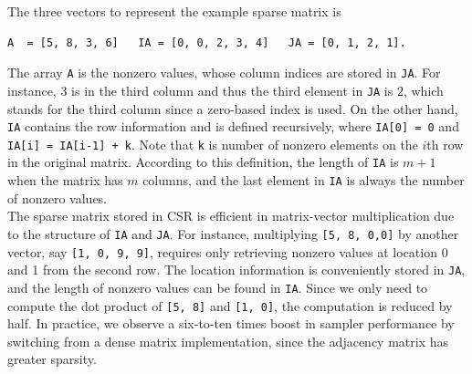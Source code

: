 \documentclass{svjour3}
\begin{document}
\noindent The three vectors to represent the example sparse matrix is
\begin{verbatim}
A  = [5, 8, 3, 6]   IA = [0, 0, 2, 3, 4]   JA = [0, 1, 2, 1].
\end{verbatim}

The array \texttt{A} is the nonzero values, whose column indices are stored in  \texttt{JA}.
For instance, 3 is in the third column and thus the third element in \texttt{JA}  is 2, which stands for the third column since a zero-based index is used.
On the other hand, \texttt{IA}  contains the row information and is defined recursively, where  \texttt{IA[0] = 0}  and  \texttt{IA[i] = IA[i-1] + k}.
Note that \texttt{k} is  number of nonzero elements on the $i$th row in the original matrix.
According to this definition, the length of \texttt{IA} is $m + 1$ when the matrix has $ m $ columns, and the last element in \texttt{IA} is always the number of nonzero values.\\

The sparse matrix stored in CSR is efficient in matrix-vector multiplication due to the structure of \texttt{IA} and \texttt{JA}.
For instance, multiplying \texttt{[5, 8, 0,0]} by another vector, say \texttt{[1, 0, 9, 9]}, requires only retrieving nonzero values at location 0 and 1 from the second row.
The location information is conveniently stored in \texttt{JA}, and the length of nonzero values can be found in \texttt{IA}.
 Since we only need to compute the dot product of \texttt{[5, 8]} and \texttt{[1, 0]}, the computation is reduced by half.
  In practice, we observe a six-to-ten times boost in sampler performance by switching from a dense matrix implementation, since the adjacency matrix has greater sparsity.
\end{document}
